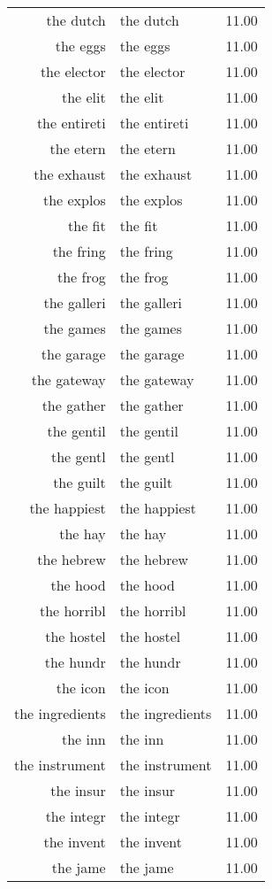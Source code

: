 \begin{table}[ht]
\begin{tabular}{rlr}
  the dutch & the dutch & 11.00 \\ 
  the eggs & the eggs & 11.00 \\ 
  the elector & the elector & 11.00 \\ 
  the elit & the elit & 11.00 \\ 
  the entireti & the entireti & 11.00 \\ 
  the etern & the etern & 11.00 \\ 
  the exhaust & the exhaust & 11.00 \\ 
  the explos & the explos & 11.00 \\ 
  the fit & the fit & 11.00 \\ 
  the fring & the fring & 11.00 \\ 
  the frog & the frog & 11.00 \\ 
  the galleri & the galleri & 11.00 \\ 
  the games & the games & 11.00 \\ 
  the garage & the garage & 11.00 \\ 
  the gateway & the gateway & 11.00 \\ 
  the gather & the gather & 11.00 \\ 
  the gentil & the gentil & 11.00 \\ 
  the gentl & the gentl & 11.00 \\ 
  the guilt & the guilt & 11.00 \\ 
  the happiest & the happiest & 11.00 \\ 
  the hay & the hay & 11.00 \\ 
  the hebrew & the hebrew & 11.00 \\ 
  the hood & the hood & 11.00 \\ 
  the horribl & the horribl & 11.00 \\ 
  the hostel & the hostel & 11.00 \\ 
  the hundr & the hundr & 11.00 \\ 
  the icon & the icon & 11.00 \\ 
  the ingredients & the ingredients & 11.00 \\ 
  the inn & the inn & 11.00 \\ 
  the instrument & the instrument & 11.00 \\ 
  the insur & the insur & 11.00 \\ 
  the integr & the integr & 11.00 \\ 
  the invent & the invent & 11.00 \\ 
  the jame & the jame & 11.00 \\ 

\end{tabular}
\end{table}
